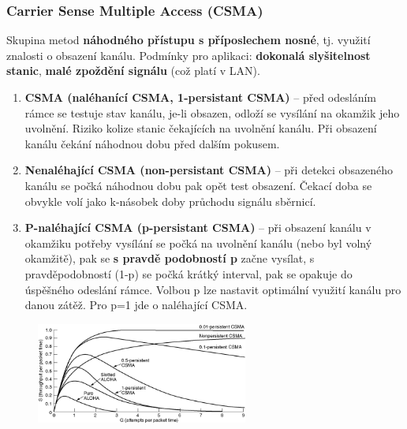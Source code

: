 \subsubsection{Carrier Sense Multiple Access (CSMA)}
Skupina metod \textbf{náhodného přístupu s příposlechem nosné}, tj. využití znalosti o obsazení kanálu. Podmínky pro aplikaci: \textbf{dokonalá slyšitelnost stanic}, \textbf{malé zpoždění signálu} (což platí v LAN).

\begin{enumerate}
\item \textbf{CSMA (naléhanící CSMA, 1-persistant CSMA)} -- před odesláním rámce se testuje stav kanálu, je-li obsazen, odloží se vysílání na okamžik jeho uvolnění. Riziko kolize stanic čekajících na uvolnění kanálu. Při obsazení kanálu čekání náhodnou dobu před dalším pokusem.
\item \textbf{Nenaléhající CSMA (non-persistant CSMA)} -- při detekci obsazeného kanálu se počká náhodnou dobu pak opět test obsazení. Čekací doba se obvykle volí jako k-násobek doby průchodu signálu sběrnicí.
\item \textbf{P-naléhající CSMA (p-persistant CSMA)} -- při obsazení kanálu v okamžiku potřeby vysílání se počká na uvolnění kanálu (nebo byl volný okamžitě), pak se \textbf{s pravdě podobností p} začne vysílat, s pravděpodobností (1-p) se počká krátký interval, pak se opakuje do úspěšného odeslání rámce. Volbou p lze nastavit optimální využití kanálu pro danou zátěž. Pro p=1 jde o naléhající CSMA.
\end{enumerate}

\begin{figure}[H]
	\centering
	\includegraphics[width=0.62\textwidth]{assets/csma-grafy}
\end{figure}

